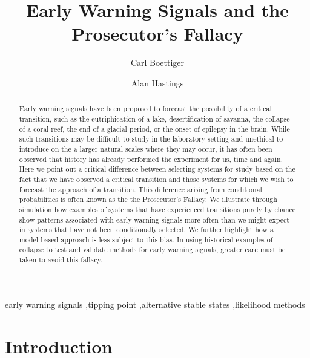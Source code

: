 \documentclass[authoryear,preprint,11pt]{elsarticle}
\begin{document}
\begin{frontmatter}
  \title{Early Warning Signals and the Prosecutor's Fallacy}
  \author[cpb]{Carl Boettiger}
  \author[esp]{Alan Hastings}
  \address[cpb]{Center for Population Biology, 1 Shields Avenue, University of California, Davis, CA, 95616 United States.}
  \address[esp]{Department of Environmental Science and Policy, University of California, Davis} 


  \begin{abstract}

  Early warning signals have been proposed to forecast the possibility of a 
  critical transition, such as the eutriphication of a lake, desertification
  of savanna, the collapse of a coral reef, the end of a glacial period, or 
  the onset of epilepsy in the brain.  While such transitions may be difficult
  to study in the laboratory setting and unethical to introduce on the a larger
  natural scales where they may occur, it has often been observed that history
  has already performed the experiment for us, time and again.  Here we point 
  out a critical difference between selecting systems for study based on the 
  fact that we have observed a critical transition and those systems for which
  we wish to forecast the approach of a transition. This difference arising
  from conditional probabilities is often known as the the Prosecutor's 
  Fallacy.  We illustrate through simulation how examples of systems that have 
  experienced transitions purely by chance show patterns associated with 
  early warning signals more often than we might expect in systems that have not
  been conditionally selected.  We further highlight how a model-based approach
  is less subject to this bias.  In using historical examples of collapse to 
  test and validate methods for early warning signals, greater care must be taken
  to avoid this fallacy.
 
  \end{abstract}

  \begin{keyword}
early warning signals \sep tipping point \sep alternative stable states \sep likelihood methods 
   \end{keyword}
 \end{frontmatter}

 \section{Introduction}
\end{document}
